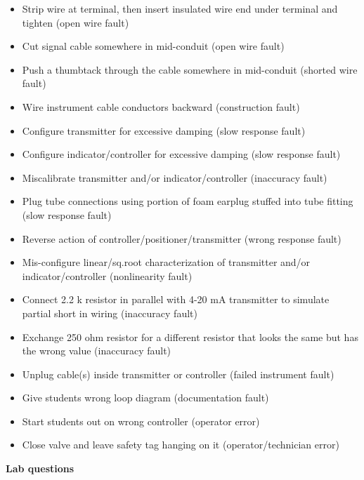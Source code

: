 \begin{itemize}
\goodbreak
\item{} Strip wire at terminal, then insert insulated wire end under terminal and tighten (open wire fault)
\item{} Cut signal cable somewhere in mid-conduit (open wire fault)
\item{} Push a thumbtack through the cable somewhere in mid-conduit (shorted wire fault)
\item{} Wire instrument cable conductors backward (construction fault)
\item{} Configure transmitter for excessive damping (slow response fault)
\item{} Configure indicator/controller for excessive damping (slow response fault)
\item{} Miscalibrate transmitter and/or indicator/controller (inaccuracy fault)
\item{} Plug tube connections using portion of foam earplug stuffed into tube fitting (slow response fault)
\item{} Reverse action of controller/positioner/transmitter (wrong response fault)
\item{} Mis-configure linear/sq.root characterization of transmitter and/or indicator/controller (nonlinearity fault)
\item{} Connect 2.2 k resistor in parallel with 4-20 mA transmitter to simulate partial short in wiring (inaccuracy fault)
\item{} Exchange 250 ohm resistor for a different resistor that looks the same but has the wrong value (inaccuracy fault) 
\item{} Unplug cable(s) inside transmitter or controller (failed instrument fault)
\item{} Give students wrong loop diagram (documentation fault)
\item{} Start students out on wrong controller (operator error)
\item{} Close valve and leave safety tag hanging on it (operator/technician error)
\end{itemize}













\vfil \eject

\noindent
{\bf Lab questions}

